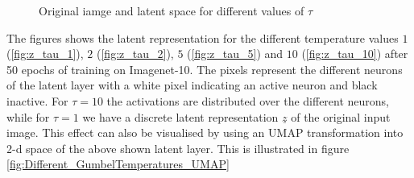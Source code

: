 \documentclass[12pt,DIV14,BCOR12mm,a4paper,footexclude,headinclude,halfparskip-,twoside,openright,openany,cleardoubleempty,idxtotoc,bibtotoc]{scrreprt} %
\numberwithin{equation}{chapter}
\begin{document}
	\begin{figure}[htb!]
	\centering
	\qquad
	\qquad
	\qquad
	\qquad
	\qquad
	\caption{Original iamge and latent space for different values of $\tau$}
	\label{fig:Different_GumbelTemperatures}
\end{figure}
The figures shows the latent representation for the different temperature values $1$ (\ref{fig:z_tau_1}), $2$ (\ref{fig:z_tau_2}), $5$ (\ref{fig:z_tau_5}) and $10$ (\ref{fig:z_tau_10}) after 50 epochs of training on Imagenet-10. The pixels represent the different neurons of the latent layer with a white pixel indicating an active neuron and black inactive. For $\tau = 10$ the activations are distributed over the different neurons, while for $\tau = 1$ we have a discrete latent representation $\underline{z}$ of the original input image. This effect can also be visualised by using an UMAP transformation into 2-d space of the above shown latent layer. This is illustrated in figure \ref{fig:Different_GumbelTemperatures_UMAP}
\end{document}

